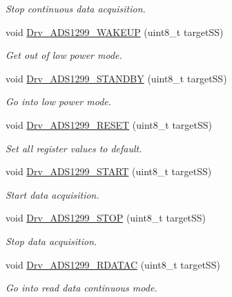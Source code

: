 \begin{DoxyCompactItemize}
\begin{DoxyCompactList}\small\item\em Stop continuous data acquisition. \end{DoxyCompactList}\item 
void \hyperlink{group___a_d_s1299___library_ga641da43b050b7dfd11d3f8234d129158}{Drv\+\_\+\+A\+D\+S1299\+\_\+\+W\+A\+K\+E\+U\+P} (uint8\+\_\+t target\+S\+S)
\begin{DoxyCompactList}\small\item\em Get out of low power mode. \end{DoxyCompactList}\item 
void \hyperlink{group___a_d_s1299___library_ga47ebee464895e8e771d03c0f9ca5e21d}{Drv\+\_\+\+A\+D\+S1299\+\_\+\+S\+T\+A\+N\+D\+B\+Y} (uint8\+\_\+t target\+S\+S)
\begin{DoxyCompactList}\small\item\em Go into low power mode. \end{DoxyCompactList}\item 
void \hyperlink{group___a_d_s1299___library_ga33a611c58e5bd53c062d118be8a09d9e}{Drv\+\_\+\+A\+D\+S1299\+\_\+\+R\+E\+S\+E\+T} (uint8\+\_\+t target\+S\+S)
\begin{DoxyCompactList}\small\item\em Set all register values to default. \end{DoxyCompactList}\item 
void \hyperlink{group___a_d_s1299___library_gab74ff026d8a21e4c41ec454debdf0928}{Drv\+\_\+\+A\+D\+S1299\+\_\+\+S\+T\+A\+R\+T} (uint8\+\_\+t target\+S\+S)
\begin{DoxyCompactList}\small\item\em Start data acquisition. \end{DoxyCompactList}\item 
void \hyperlink{group___a_d_s1299___library_ga745a56f8f9a82a3ff488fdfa44b5877c}{Drv\+\_\+\+A\+D\+S1299\+\_\+\+S\+T\+O\+P} (uint8\+\_\+t target\+S\+S)
\begin{DoxyCompactList}\small\item\em Stop data acquisition. \end{DoxyCompactList}\item 
void \hyperlink{group___a_d_s1299___library_ga51676dbe90976a582680808c7f32eadc}{Drv\+\_\+\+A\+D\+S1299\+\_\+\+R\+D\+A\+T\+A\+C} (uint8\+\_\+t target\+S\+S)
\begin{DoxyCompactList}\small\item\em Go into read data continuous mode. \end{DoxyCompactList}\item 

\end{DoxyCompactItemize}
